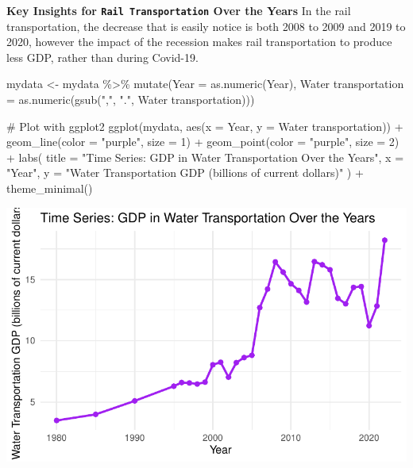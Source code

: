 \documentclass[
  letterpaper,
  DIV=11,
  numbers=noendperiod]{scrreprt}
\newenvironment{Shaded}{\begin{snugshade}}{\end{snugshade}}
\newcommand{\AttributeTok}[1]{\textcolor[rgb]{0.40,0.45,0.13}{#1}}
\newcommand{\CommentTok}[1]{\textcolor[rgb]{0.37,0.37,0.37}{#1}}
\newcommand{\DecValTok}[1]{\textcolor[rgb]{0.68,0.00,0.00}{#1}}
\newcommand{\FunctionTok}[1]{\textcolor[rgb]{0.28,0.35,0.67}{#1}}
\newcommand{\NormalTok}[1]{\textcolor[rgb]{0.00,0.23,0.31}{#1}}
\newcommand{\OtherTok}[1]{\textcolor[rgb]{0.00,0.23,0.31}{#1}}
\newcommand{\SpecialCharTok}[1]{\textcolor[rgb]{0.37,0.37,0.37}{#1}}
\newcommand{\StringTok}[1]{\textcolor[rgb]{0.13,0.47,0.30}{#1}}
\begin{document}
\textbf{Key Insights for \texttt{Rail\ Transportation} Over the Years}
In the rail transportation, the decrease that is easily notice is both
2008 to 2009 and 2019 to 2020, however the impact of the recession makes
rail transportation to produce less GDP, rather than during Covid-19.

\begin{Shaded}
\begin{Highlighting}[]
\NormalTok{mydata }\OtherTok{\textless{}{-}}\NormalTok{ mydata }\SpecialCharTok{\%\textgreater{}\%}
  \FunctionTok{mutate}\NormalTok{(}\AttributeTok{Year =} \FunctionTok{as.numeric}\NormalTok{(Year),}
         \StringTok{\textasciigrave{}}\AttributeTok{Water transportation}\StringTok{\textasciigrave{}} \OtherTok{=} \FunctionTok{as.numeric}\NormalTok{(}\FunctionTok{gsub}\NormalTok{(}\StringTok{","}\NormalTok{, }\StringTok{"."}\NormalTok{, }\StringTok{\textasciigrave{}}\AttributeTok{Water transportation}\StringTok{\textasciigrave{}}\NormalTok{)))}

\CommentTok{\# Plot with ggplot2}
\FunctionTok{ggplot}\NormalTok{(mydata, }\FunctionTok{aes}\NormalTok{(}\AttributeTok{x =}\NormalTok{ Year, }\AttributeTok{y =} \StringTok{\textasciigrave{}}\AttributeTok{Water transportation}\StringTok{\textasciigrave{}}\NormalTok{)) }\SpecialCharTok{+}
  \FunctionTok{geom\_line}\NormalTok{(}\AttributeTok{color =} \StringTok{"purple"}\NormalTok{, }\AttributeTok{size =} \DecValTok{1}\NormalTok{) }\SpecialCharTok{+}
  \FunctionTok{geom\_point}\NormalTok{(}\AttributeTok{color =} \StringTok{"purple"}\NormalTok{, }\AttributeTok{size =} \DecValTok{2}\NormalTok{) }\SpecialCharTok{+}
  \FunctionTok{labs}\NormalTok{(}
    \AttributeTok{title =} \StringTok{"Time Series: GDP in Water Transportation Over the Years"}\NormalTok{,}
    \AttributeTok{x =} \StringTok{"Year"}\NormalTok{,}
    \AttributeTok{y =} \StringTok{"Water Transportation GDP (billions of current dollars)"}
\NormalTok{  ) }\SpecialCharTok{+}
  \FunctionTok{theme\_minimal}\NormalTok{()}
\end{Highlighting}
\end{Shaded}

\includegraphics{FinalProject_Abigail_files/figure-pdf/unnamed-chunk-4-1.pdf}
\end{document}

